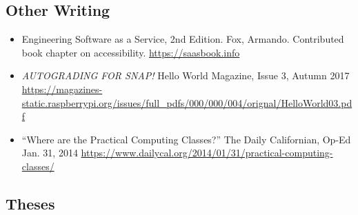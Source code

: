 \vspace{6pt}

\subsection{Other Writing}

\vspace{5pt}

\begin{itemize}

    \setlength\itemsep{1em}
    
    \item Engineering Software as a Service, 2nd Edition. Fox, Armando. Contributed book chapter on accessibility.
    \newline
    \href{https://saasbook.info}{https://saasbook.info}

    \item{\textit{AUTOGRADING FOR SNAP!} Hello World Magazine, Issue 3, Autumn 2017}
    \newline
    \small{\href{https://magazines-static.raspberrypi.org/issues/full\_pdfs/000/000/004/orignal/HelloWorld03.pdf}{https://magazines-static.raspberrypi.org/issues/full\_pdfs/000/000/004/orignal/HelloWorld03.pdf}}
    
    \item{``Where are the Practical Computing Classes?'' The Daily Californian, Op-Ed Jan. 31, 2014
    \newline
    \href{https://www.dailycal.org/2014/01/31/practical-computing-classes/}{https://www.dailycal.org/2014/01/31/practical-computing-classes/}}

\end{itemize}


\subsection{Theses}

\vspace{5pt}

